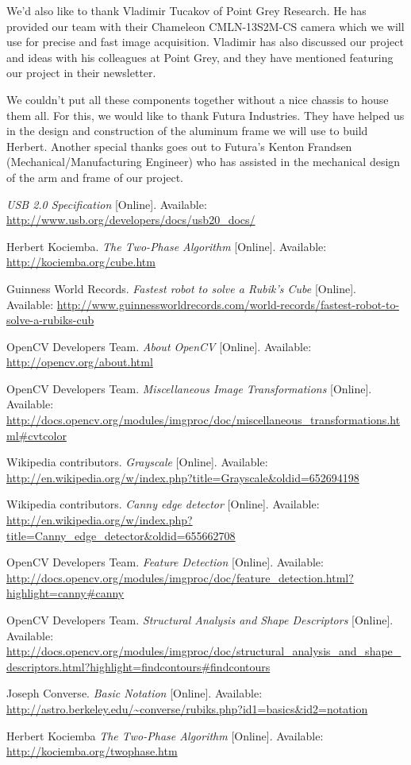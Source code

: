 \documentclass[11pt,english]{article}
\begin{document}
We'd also like to thank Vladimir Tucakov of Point Grey Research. He has provided our team with their Chameleon CMLN-13S2M-CS camera which we will use for precise and fast image acquisition. Vladimir has also discussed our project and ideas with his colleagues at Point Grey, and they have mentioned featuring our project in their newsletter.

We couldn't put all these components together without a nice chassis to house them all. For this, we would like to thank Futura Industries. They have helped us in the design and construction of the aluminum frame we will use to build Herbert. Another special thanks goes out to Futura's Kenton Frandsen (Mechanical/Manufacturing Engineer) who has assisted in the mechanical design of the arm and frame of our project.

\begin{thebibliography}{9}


\emph{USB 2.0 Specification}
[Online]. Available: \url{http://www.usb.org/developers/docs/usb20_docs/}

Herbert Kociemba.
\emph{The Two-Phase Algorithm}
[Online]. Available: \url{http://kociemba.org/cube.htm}

Guinness World Records.
\emph{Fastest robot to solve a Rubik's Cube}
[Online]. Available: \url{http://www.guinnessworldrecords.com/world-records/fastest-robot-to-solve-a-rubiks-cub}

OpenCV Developers Team.
\emph{About OpenCV}
[Online]. Available: \url{http://opencv.org/about.html}

OpenCV Developers Team.
\emph{Miscellaneous Image Transformations}
[Online]. Available: \url{http://docs.opencv.org/modules/imgproc/doc/miscellaneous_transformations.html#cvtcolor}

Wikipedia contributors.
\emph{Grayscale}
[Online]. Available: \url{http://en.wikipedia.org/w/index.php?title=Grayscale&oldid=652694198}

Wikipedia contributors.
\emph{Canny edge detector}
[Online]. Available: \url{http://en.wikipedia.org/w/index.php?title=Canny_edge_detector&oldid=655662708}

OpenCV Developers Team.
\emph{Feature Detection}
[Online]. Available: \url{http://docs.opencv.org/modules/imgproc/doc/feature_detection.html?highlight=canny#canny}

OpenCV Developers Team.
\emph{Structural Analysis and Shape Descriptors}
[Online]. Available: \url{http://docs.opencv.org/modules/imgproc/doc/structural_analysis_and_shape_descriptors.html?highlight=findcontours#findcontours}

Joseph Converse.
\emph{Basic Notation}
[Online]. Available: \url{http://astro.berkeley.edu/~converse/rubiks.php?id1=basics&id2=notation}

Herbert Kociemba
\emph{The Two-Phase Algorithm}
[Online]. Available: \url{http://kociemba.org/twophase.htm}
\end{thebibliography}
\end{document}
